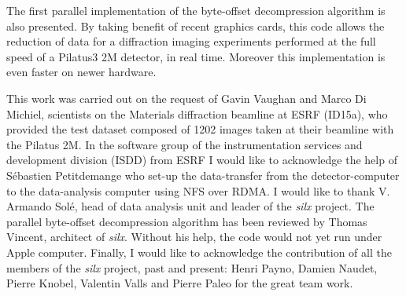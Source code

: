 \documentclass[preprint, pdf]{iucr}              %
\begin{document}
The first parallel implementation of the byte-offset decompression 
algorithm is also presented. 
By taking benefit of recent graphics cards, this code allows the reduction
of data for a diffraction imaging experiments performed at the full speed of
a Pilatus3 2M detector, in real time. 
Moreover this implementation is even faster on newer hardware. 

 
This work was carried out on the request of Gavin Vaughan and Marco Di
Michiel, scientists on the Materials diffraction beamline at ESRF (ID15a), who
provided the test dataset composed of 1202 images taken at their beamline with
the Pilatus 2M.
In the software group of the instrumentation services and development division
(ISDD) from ESRF I would like to acknowledge the help of Sébastien Petitdemange
who set-up the data-transfer from the detector-computer to the data-analysis
computer using NFS over RDMA. 
I would like to thank V. Armando Solé, head of data analysis unit and leader of
the \textit{silx} project. 
The parallel byte-offset decompression algorithm has been reviewed by Thomas
Vincent, architect of \textit{silx}. Without his help, the code would not yet
run under Apple computer.
Finally, I would like to acknowledge the contribution of all the members of
the \textit{silx} project, past and present:
Henri Payno, Damien Naudet, Pierre Knobel, Valentin Valls and
Pierre Paleo for the great team work.



\end{document}
